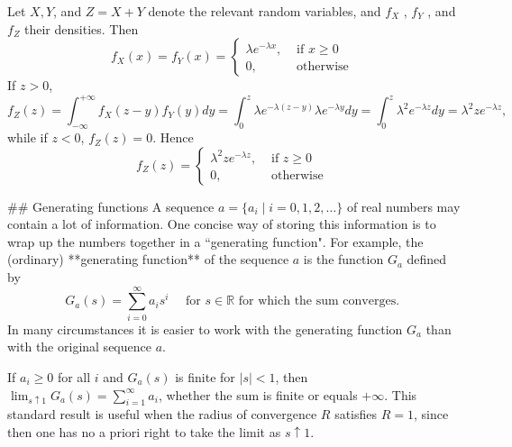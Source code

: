 \begin{example}
Let $X, Y$, and $Z = X + Y$ denote the relevant random variables, and $f_X$ , $f_Y$ , and $f_Z$ their densities. Then
\begin{equation*}
    f_{X}(x)=f_{Y}(x)=\left\{\begin{array}{ll}{\lambda e^{-\lambda x},} & {\text { if } x \geq 0} \\ {0,} & {\text { otherwise }}\end{array}\right.
\end{equation*}
If $z > 0$,
\begin{equation*}
    f_{Z}(z)=\int_{-\infty}^{+\infty} f_{X}(z-y) f_{Y}(y) d y =\int_{0}^{z} \lambda e^{-\lambda(z-y)} \lambda e^{-\lambda y} d y =\int_{0}^{z} \lambda^{2} e^{-\lambda z} d y =\lambda^{2} z e^{-\lambda z},
\end{equation*}
while if $z < 0$, $f_Z(z) = 0$. Hence 
\begin{equation*}
    f_{Z}(z)=\left\{\begin{array}{ll}{\lambda^{2} z e^{-\lambda z},} & {\text { if } z \geq 0} \\ {0,} & {\text { otherwise }}\end{array}\right.
\end{equation*}
\end{example}


## Generating functions
A sequence $a = \{a_i \;\vert\; i = 0, 1 , 2, \dots \}$ of real numbers may contain a lot of information. One concise way of storing this information is to wrap up the numbers together in a ``generating function". For example, the (ordinary) **generating function** of the sequence $a$ is the function $G_a$ defined by 
\begin{equation*}
    G_{a}(s)=\sum_{i=0}^{\infty} a_{i} s^{i} \quad \text { for } s \in \mathbb{R} \text { for which the sum converges. }
\end{equation*}
In many circumstances it is easier to work with the generating function $G_a$ than with the original sequence $a$.

\begin{theorem}
If $a_i \geq 0$ for all $i$ and $G_a(s)$ is finite for $\left\vert s \right\vert < 1$, then $\lim_{s \uparrow 1} G_a (s) = \sum_{i=1}^ \infty a_i$, whether the sum is finite or equals $+\infty$. This standard result is useful when the radius of convergence $R$ satisfies $R = 1$, since then one has no a priori right to take the limit as $s \uparrow 1$.
\end{theorem}


